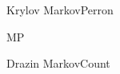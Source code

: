 \documentclass{newsiambook}
\begin{document}
{Krylov}
{MarkovPerron}

{MP}

{Drazin}
{MarkovCount}






%
\end{document}
